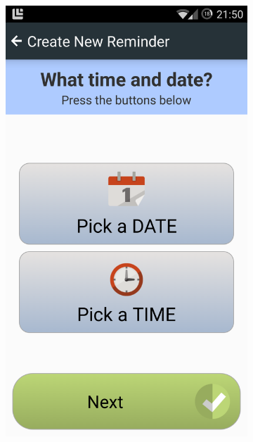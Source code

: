 \begin{figure}[h]
    \centering
    \begin{subfigure}[t]{0.3\textwidth}
        \centering
        \includegraphics[width=\textwidth]{Files/treatment-study-1/figures/app-remindercreate-1}
        \caption{}
        \label{fig: remindercreate-time}
    \end{subfigure}
    \hfill
    \begin{subfigure}[t]{0.3\textwidth}
        \centering

\end{subfigure}
\end{figure}
